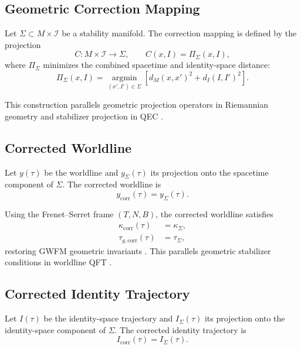 \documentclass[aip,jmp,reprint,onecolumn,nofootinbib]{revtex4-2}
\begin{document}
\subsection{Geometric Correction Mapping}

Let $\Sigma \subset M \times \mathcal{I}$ be a stability manifold. The correction mapping is 
defined by the projection
\begin{equation}
C : M \times \mathcal{I} \to \Sigma, \qquad
C(x,I) = \Pi_\Sigma(x,I),
\end{equation}
where $\Pi_\Sigma$ minimizes the combined spacetime and identity-space distance:
\begin{equation}
\Pi_\Sigma(x,I)
=
\operatorname*{argmin}_{(x',I') \in \Sigma}
\left[
d_M(x,x')^2 + d_I(I,I')^2
\right].
\end{equation}

This construction parallels geometric projection operators in Riemannian geometry 
\cite{doCarmo} and stabilizer projection in QEC \cite{GottesmanQEC}.

\subsection{Corrected Worldline}

Let $y(\tau)$ be the worldline and $y_\Sigma(\tau)$ its projection onto the spacetime 
component of $\Sigma$. The corrected worldline is
\begin{equation}
y_{\mathrm{corr}}(\tau) = y_\Sigma(\tau).
\end{equation}

Using the Frenet--Serret frame $(T,N,B)$, the corrected worldline satisfies
\begin{align}
\kappa_{\mathrm{corr}}(\tau) &= \kappa_\Sigma, \\
\tau_{g,\mathrm{corr}}(\tau) &= \tau_\Sigma,
\end{align}
restoring GWFM geometric invariants \cite{DuttonElectronField2026}. This parallels 
geometric stabilizer conditions in worldline QFT \cite{Polyakov1987,Schubert2001}.

\subsection{Corrected Identity Trajectory}

Let $I(\tau)$ be the identity-space trajectory and $I_\Sigma(\tau)$ its projection onto the 
identity-space component of $\Sigma$. The corrected identity trajectory is
\begin{equation}
I_{\mathrm{corr}}(\tau) = I_\Sigma(\tau).
\end{equation}
\end{document}

